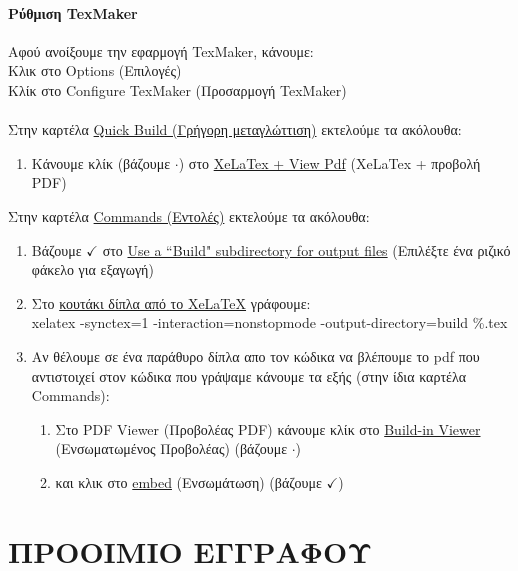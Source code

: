 \documentclass[a4paper, 12pt, oneside, xelatex, final]{article}
\begin{document}
		\subsection{Ρύθμιση TexMaker}
		\noindent Αφού ανοίξουμε την εφαρμογή TexMaker, κάνουμε:\\
		Κλικ στο Options (Επιλογές)\\
		Κλίκ στο Configure TexMaker (Προσαρμογή TexMaker)\\
		\\
		Στην καρτέλα \underline{Quick Build (Γρήγορη μεταγλώττιση)} εκτελούμε τα ακόλουθα:
		\begin{enumerate}
		\item Κάνουμε κλίκ (βάζουμε $\cdot$) στο \underline {XeLaTex + View Pdf} (XeLaTex + προβολή PDF)
		\end{enumerate}
		Στην καρτέλα \underline{Commands (Εντολές)} εκτελούμε τα ακόλουθα:
		\begin{enumerate}
		\item Βάζουμε $\checkmark$ στο \underline{Use a ``Build" subdirectory for output files} (Επιλέξτε ένα ριζικό φάκελο για εξαγωγή)
		\item Στο \underline{κουτάκι δίπλα από το  XeLaTeX} γράφουμε:\\
				xelatex -synctex=1 -interaction=nonstopmode -output-directory=build \%.tex
		\item Αν θέλουμε σε ένα παράθυρο δίπλα απο τον κώδικα να βλέπουμε το pdf που αντιστοιχεί στον κώδικα που γράψαμε κάνουμε τα εξής (στην ίδια καρτέλα Commands):
			\begin{enumerate}
				\item Στο PDF Viewer (Προβολέας PDF) κάνουμε κλίκ στο \underline{Build-in Viewer} (Ενσωματωμένος Προβολέας) (βάζουμε $\cdot$)
				\item και κλικ στο \underline{embed} (Ενσωμάτωση) (βάζουμε $\checkmark$)
			\end{enumerate}
		\end{enumerate}
		
\newpage
\part{ΠΡΟΟΙΜΙΟ ΕΓΓΡΑΦΟΥ}
\end{document}
